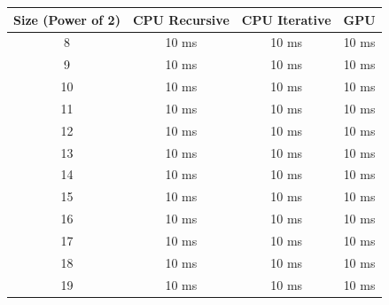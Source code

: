 \documentclass[a4paper, 12pt, oneside]{article}
\begin{document}
\begin{center}
  \begin{tabular}{ |c|c|c|c| }
    \hline
    \textbf{Size (Power of 2)} & \textbf{CPU Recursive} & \textbf{CPU Iterative} & \textbf{GPU} \\
    \hline
    8                          & 10 ms                  & 10 ms                  & 10 ms        \\
    9                          & 10 ms                  & 10 ms                  & 10 ms        \\
    10                         & 10 ms                  & 10 ms                  & 10 ms        \\
    11                         & 10 ms                  & 10 ms                  & 10 ms        \\
    12                         & 10 ms                  & 10 ms                  & 10 ms        \\
    13                         & 10 ms                  & 10 ms                  & 10 ms        \\
    14                         & 10 ms                  & 10 ms                  & 10 ms        \\
    15                         & 10 ms                  & 10 ms                  & 10 ms        \\
    16                         & 10 ms                  & 10 ms                  & 10 ms        \\
    17                         & 10 ms                  & 10 ms                  & 10 ms        \\
    18                         & 10 ms                  & 10 ms                  & 10 ms        \\
    19                         & 10 ms                  & 10 ms                  & 10 ms        \\
    \hline
  \end{tabular}
\end{center}
\end{document}

